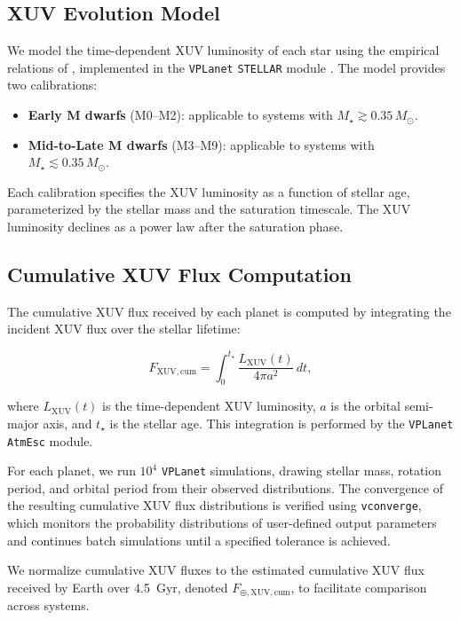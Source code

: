 \documentclass[twocolumn]{aastex631}
\newcommand{\vplanet}{\texttt{VPLanet}}
\newcommand{\vconverge}{\texttt{vconverge}}
\newcommand{\Fcum}{F_{\mathrm{XUV,cum}}}
\newcommand{\Fearth}{F_{\oplus,\mathrm{XUV,cum}}}
\newcommand{\Msun}{M_{\odot}}
\begin{document}
\subsection{XUV Evolution Model} \label{sec:xuv}

We model the time-dependent XUV luminosity of each star using the empirical
relations of \citet{Engle2024}, implemented in the \vplanet{} \texttt{STELLAR}
module \citep{Barnes2020}. The model provides two calibrations:

\begin{itemize}
  \item \textbf{Early M dwarfs} (M0--M2): applicable to systems with
    $M_\star \gtrsim 0.35\,\Msun$.
  \item \textbf{Mid-to-Late M dwarfs} (M3--M9): applicable to systems with
    $M_\star \lesssim 0.35\,\Msun$.
\end{itemize}

Each calibration specifies the XUV luminosity as a function of stellar age,
parameterized by the stellar mass and the saturation timescale. The XUV
luminosity declines as a power law after the saturation phase.

\subsection{Cumulative XUV Flux Computation} \label{sec:cumflux}

The cumulative XUV flux received by each planet is computed by integrating the
incident XUV flux over the stellar lifetime:

\begin{equation}
  \Fcum = \int_0^{t_\star} \frac{L_{\mathrm{XUV}}(t)}{4\pi a^2}\,dt,
  \label{eq:cumflux}
\end{equation}

\noindent where $L_{\mathrm{XUV}}(t)$ is the time-dependent XUV luminosity,
$a$ is the orbital semi-major axis, and $t_\star$ is the stellar age. This
integration is performed by the \vplanet{} \texttt{AtmEsc} module.

For each planet, we run $10^4$ \vplanet{} simulations, drawing stellar mass,
rotation period, and orbital period from their observed distributions. The
convergence of the resulting cumulative XUV flux distributions is verified
using \vconverge{}, which monitors the probability distributions of
user-defined output parameters and continues batch simulations until a
specified tolerance is achieved.

We normalize cumulative XUV fluxes to the estimated cumulative XUV flux
received by Earth over 4.5~Gyr, denoted $\Fearth$, to facilitate comparison
across systems.
\end{document}
